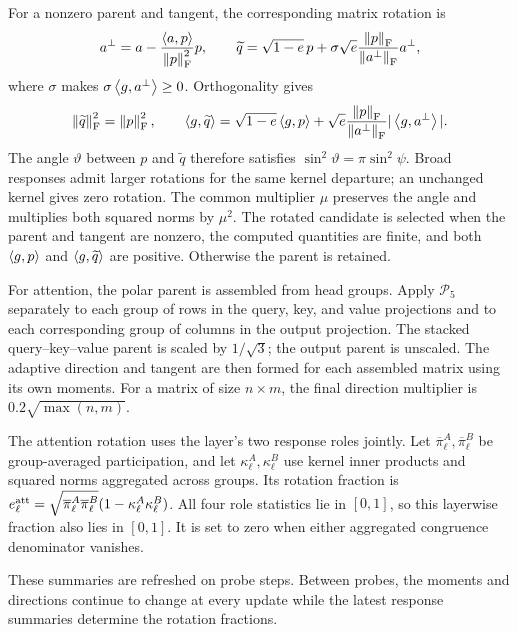 For a nonzero parent and tangent, the corresponding matrix rotation is
\begin{equation}
 a^\perp=a-\frac{\left\langle a,p\right\rangle}{\left\lVert p\right\rVert_{\mathrm F}^2}p,
 \qquad \widetilde q=
 \sqrt{1-e}\,p+\sigma\sqrt e\frac{\left\lVert p\right\rVert_{\mathrm F}}{\left\lVert a^\perp\right\rVert_{\mathrm F}}a^\perp,
 \label{eq:tangent-chord}
\end{equation}
where $\sigma$ makes $\sigma\left\langle g,a^\perp\right\rangle\geq0$.
Orthogonality gives
\begin{equation}
 \left\lVert \widetilde q\right\rVert_{\mathrm F}^2=\left\lVert p\right\rVert_{\mathrm F}^2,
 \qquad
 \left\langle g,\widetilde q\right\rangle
 =\sqrt{1-e}\left\langle g,p\right\rangle
 +\sqrt e\frac{\left\lVert p\right\rVert_{\mathrm F}}{\left\lVert a^\perp\right\rVert_{\mathrm F}}
 |\left\langle g,a^\perp\right\rangle|.
 \label{eq:rotation-property}
\end{equation}
The angle $\vartheta$ between $p$ and $\widetilde q$ therefore
satisfies $\sin^2\vartheta=\pi\sin^2\psi$.
Broad responses admit larger rotations for the same kernel departure;
an unchanged kernel gives zero rotation. The common multiplier $\mu$
preserves the angle and multiplies both squared norms by $\mu^2$.
The rotated candidate is selected when the parent and tangent are
nonzero, the computed quantities are finite, and both
$\left\langle g,p\right\rangle$ and $\left\langle g,\widetilde q\right\rangle$ are positive.
Otherwise the parent is retained.

For attention, the polar parent is assembled from head groups.
Apply $\mathcal P_5$ separately to each group of rows in the query,
key, and value projections and to each corresponding group of
columns in the output projection. The stacked query--key--value
parent is scaled by $1/\sqrt3$; the output parent is unscaled.
The adaptive direction and tangent are then formed for each assembled
matrix using its own moments. For a matrix of size $n\times m$,
the final direction multiplier is $0.2\sqrt{\max(n,m)}$.

The attention rotation uses the layer's two response roles jointly. Let
$\overline\pi_\ell^A,\overline\pi_\ell^B$ be group-averaged
participation, and let $\kappa_\ell^A,\kappa_\ell^B$ use kernel
inner products and squared norms aggregated across groups.
Its rotation fraction is
$e_\ell^{\rm att}=\sqrt{\overline\pi_\ell^A\overline\pi_\ell^B}
(1-\kappa_\ell^A\kappa_\ell^B)$.
All four role statistics lie in $[0,1]$, so this layerwise fraction
also lies in $[0,1]$.
It is set to zero when either aggregated congruence denominator vanishes.

These summaries are refreshed on probe steps. Between probes,
the moments and directions continue to change at every update while
the latest response summaries determine the rotation fractions.

